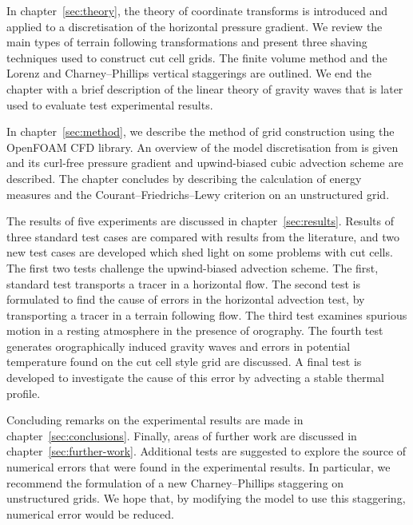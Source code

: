 In chapter~\ref{sec:theory}, the theory of coordinate transforms is introduced and applied to a discretisation of the horizontal pressure gradient.  We review the main types of terrain following transformations and present three shaving techniques used to construct cut cell grids.  The finite volume method and the Lorenz and Charney--Phillips vertical staggerings are outlined.  We end the chapter with a brief description of the linear theory of gravity waves that is later used to evaluate test experimental results.

In chapter~\ref{sec:method}, we describe the method of grid construction using the OpenFOAM CFD library.  An overview of the model discretisation from \textcite{weller-shahrokhi2014} is given and its curl-free pressure gradient and upwind-biased cubic advection scheme are described.  The chapter concludes by describing the calculation of energy measures and the Courant--Friedrichs--Lewy criterion on an unstructured grid.

The results of five experiments are discussed in chapter~\ref{sec:results}.  Results of three standard test cases are compared with results from the literature, and two new test cases are developed which shed light on some problems with cut cells.  The first two tests challenge the upwind-biased advection scheme.  The first, standard test transports a tracer in a horizontal flow.  The second test is formulated to find the cause of errors in the horizontal advection test, by transporting a tracer in a terrain following flow.  The third test examines spurious motion in a resting atmosphere in the presence of orography.  The fourth test generates orographically induced gravity waves and errors in potential temperature found on the cut cell style grid are discussed.  A final test is developed to investigate the cause of this error by advecting a stable thermal profile.

Concluding remarks on the experimental results are made in chapter~\ref{sec:conclusions}.  Finally, areas of further work are discussed in chapter~\ref{sec:further-work}.  Additional tests are suggested to explore the source of numerical errors that were found in the experimental results.  In particular, we recommend the formulation of a new Charney--Phillips staggering on unstructured grids.  We hope that, by modifying the model to use this staggering, numerical error would be reduced.
